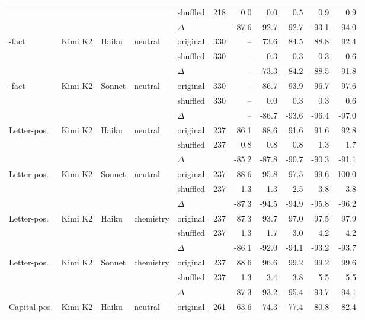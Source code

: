 \begin{table}[h]
\begin{tabular}{l l l l l r r r r r r}
  &     &     &     & shuffled & 218 & 0.0 & 0.0 & 0.5 & 0.9 & 0.9 \\
  &     &     &     & $\Delta$ &  & -87.6 & -92.7 & -92.7 & -93.1 & -94.0 \\
\addlinespace[3pt]
2-fact & Kimi K2 & Haiku & neutral & original & 330 & -- & 73.6 & 84.5 & 88.8 & 92.4 \\
  &     &     &     & shuffled & 330 & -- & 0.3 & 0.3 & 0.3 & 0.6 \\
  &     &     &     & $\Delta$ &  & -- & -73.3 & -84.2 & -88.5 & -91.8 \\
\addlinespace[3pt]
2-fact & Kimi K2 & Sonnet & neutral & original & 330 & -- & 86.7 & 93.9 & 96.7 & 97.6 \\
  &     &     &     & shuffled & 330 & -- & 0.0 & 0.3 & 0.3 & 0.6 \\
  &     &     &     & $\Delta$ &  & -- & -86.7 & -93.6 & -96.4 & -97.0 \\
\addlinespace[3pt]
Letter-pos. & Kimi K2 & Haiku & neutral & original & 237 & 86.1 & 88.6 & 91.6 & 91.6 & 92.8 \\
  &     &     &     & shuffled & 237 & 0.8 & 0.8 & 0.8 & 1.3 & 1.7 \\
  &     &     &     & $\Delta$ &  & -85.2 & -87.8 & -90.7 & -90.3 & -91.1 \\
\addlinespace[3pt]
Letter-pos. & Kimi K2 & Sonnet & neutral & original & 237 & 88.6 & 95.8 & 97.5 & 99.6 & 100.0 \\
  &     &     &     & shuffled & 237 & 1.3 & 1.3 & 2.5 & 3.8 & 3.8 \\
  &     &     &     & $\Delta$ &  & -87.3 & -94.5 & -94.9 & -95.8 & -96.2 \\
\addlinespace[3pt]
Letter-pos. & Kimi K2 & Haiku & chemistry & original & 237 & 87.3 & 93.7 & 97.0 & 97.5 & 97.9 \\
  &     &     &     & shuffled & 237 & 1.3 & 1.7 & 3.0 & 4.2 & 4.2 \\
  &     &     &     & $\Delta$ &  & -86.1 & -92.0 & -94.1 & -93.2 & -93.7 \\
\addlinespace[3pt]
Letter-pos. & Kimi K2 & Sonnet & chemistry & original & 237 & 88.6 & 96.6 & 99.2 & 99.2 & 99.6 \\
  &     &     &     & shuffled & 237 & 1.3 & 3.4 & 3.8 & 5.5 & 5.5 \\
  &     &     &     & $\Delta$ &  & -87.3 & -93.2 & -95.4 & -93.7 & -94.1 \\
\addlinespace[3pt]
Capital-pos. & Kimi K2 & Haiku & neutral & original & 261 & 63.6 & 74.3 & 77.4 & 80.8 & 82.4 \\

\end{tabular}
\end{table}
